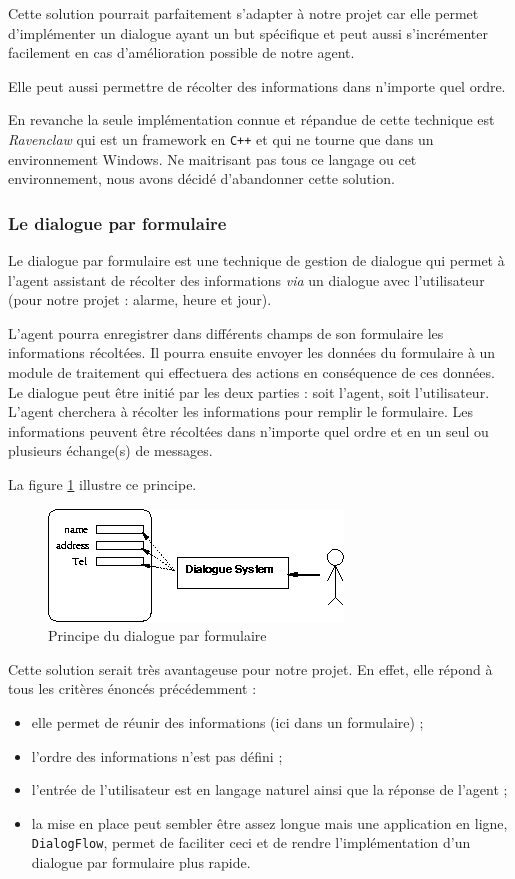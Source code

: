 \FloatBarrier

Cette solution pourrait parfaitement s'adapter à notre projet car elle permet d'implémenter un dialogue ayant un but spécifique et peut aussi s'incrémenter facilement en cas d'amélioration possible de notre agent. 

Elle peut aussi permettre de récolter des informations dans n'importe quel ordre. 

En revanche la seule implémentation connue et répandue de cette technique est \textit{Ravenclaw} qui est un framework en \texttt{C++} et qui ne tourne que dans un environnement Windows. Ne maitrisant pas tous ce langage ou cet environnement, nous avons décidé d'abandonner cette solution. 

\subsubsection{Le dialogue par formulaire}
Le dialogue par formulaire est une technique de gestion de dialogue qui permet à l'agent assistant de récolter des informations \emph{via} un dialogue avec l'utilisateur (pour notre projet : alarme, heure et jour). 

L'agent pourra enregistrer dans différents champs de son formulaire les informations récoltées. Il pourra ensuite envoyer les données du formulaire à un module de traitement qui effectuera des actions en conséquence de ces données. Le dialogue peut être initié par les deux parties : soit l'agent, soit l'utilisateur. L'agent cherchera à récolter les informations pour remplir le formulaire. Les informations peuvent être récoltées dans n'importe quel ordre et en un seul ou plusieurs échange(s) de messages.

La figure \ref{form-dialog} illustre ce principe.
\begin{figure}[H]
\centering
    \includegraphics[scale=0.7]{images/slot.png} %
    \caption{Principe du dialogue par formulaire}
    \label{form-dialog}
\end{figure}

Cette solution serait très avantageuse pour notre projet. 
En effet, elle répond à tous les critères énoncés précédemment : 
\begin{itemize}
    \item elle permet de réunir des informations (ici dans un formulaire) ;
    \item l'ordre des informations n'est pas défini ;
    \item l'entrée de l'utilisateur est en langage naturel ainsi que la réponse de l'agent ;
    \item la mise en place peut sembler être assez longue mais une application en ligne, \texttt{DialogFlow}, permet de faciliter ceci et de rendre l'implémentation d'un dialogue par formulaire plus rapide.
\end{itemize}
\FloatBarrier



